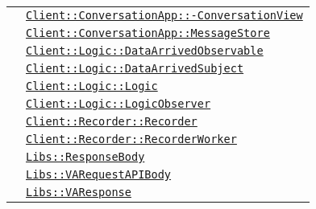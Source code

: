 \begin{longtable}{|>{\centering}m{3cm}|m{10cm}<{\centering}|}
& \hyperref[Client::ConversationApp::ConversationView]{\texttt{Client::ConversationApp::-\linebreak ConversationView}}\\
& \hyperref[Client::ConversationApp::MessageStore]{\texttt{Client::ConversationApp::MessageStore}}\\
& \hyperref[Client::Logic::DataArrivedObservable]{\texttt{Client::Logic::DataArrivedObservable}}\\
& \hyperref[Client::Logic::DataArrivedSubject]{\texttt{Client::Logic::DataArrivedSubject}}\\
& \hyperref[Client::Logic::Logic]{\texttt{Client::Logic::Logic}}\\
& \hyperref[Client::Logic::LogicObserver]{\texttt{Client::Logic::LogicObserver}}\\
& \hyperref[Client::Recorder::Recorder]{\texttt{Client::Recorder::Recorder}}\\
& \hyperref[Client::Recorder::RecorderWorker]{\texttt{Client::Recorder::RecorderWorker}}\\
& \hyperref[Libs::ResponseBody]{\texttt{Libs::ResponseBody}}\\
& \hyperref[Libs::VARequestAPIBody]{\texttt{Libs::VARequestAPIBody}}\\
& \hyperref[Libs::VAResponse]{\texttt{Libs::VAResponse}}\\ \hline


\end{longtable}
